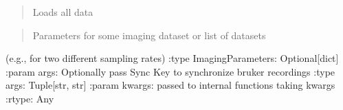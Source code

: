 \documentclass[letterpaper,10pt,english]{sphinxmanual}
\begin{document}
\begin{fulllineitems}
\begin{fulllineitems}
\begin{quote}
\sphinxAtStartPar
Loads all data
\end{quote}
\begin{quote}\begin{description}
\sphinxAtStartPar
{} \textendash{} Parameters for some imaging dataset or list of datasets

\end{description}\end{quote}

\sphinxAtStartPar
(e.g., for two different sampling rates)
:type ImagingParameters: Optional{[}dict{]}
:param args: Optionally pass Sync Key to synchronize bruker recordings
:type args: Tuple{[}str, str{]}
:param kwargs: passed to internal functions taking kwargs
:rtype: Any

\end{fulllineitems}


\end{fulllineitems}

\end{document}
